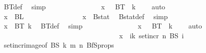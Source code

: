 \begin{isabellebody}
\ BT{\isacharunderscore}{\kern0pt}def\ \isamarkupfalse%
\ simp\isanewline
\ \ \ \ \ \ \ \ \ \ \ \ \isamarkupfalse%
\ \isamarkupfalse%
\ {\isachardoublequoteopen}x\ {\isasymin}\ {\isasymUnion}\ {\isacharparenleft}{\kern0pt}BT\ {\isacharbackquote}{\kern0pt}\ {\isacharbraceleft}{\kern0pt}{\isachardot}{\kern0pt}{\isachardot}{\kern0pt}k\ {\isacharplus}{\kern0pt}\ {}{\isacharbraceright}{\kern0pt}{\isacharparenright}{\kern0pt}{\isachardoublequoteclose}\ \isamarkupfalse%
\ auto\isanewline
\ \ \ \ \ \ \ \ \ \ \isamarkupfalse%
\isanewline
\ \ \ \ \ \ \ \ \ \ \ \ \isamarkupfalse%
\ {\isachardoublequoteopen}x\ {\isasymin}\ BL\ {}{\isachardoublequoteclose}\isanewline
\ \ \ \ \ \ \ \ \ \ \ \ \isamarkupfalse%
\ \isamarkupfalse%
\ {\isachardoublequoteopen}x\ {\isasymin}\ Bstat{\isachardoublequoteclose}\ \isamarkupfalse%
\ Bstat{\isacharunderscore}{\kern0pt}def\ \isamarkupfalse%
\ simp\isanewline
\ \ \ \ \ \ \ \ \ \ \ \ \isamarkupfalse%
\ \isamarkupfalse%
\ {\isachardoublequoteopen}x\ {\isasymin}\ BT\ {\isacharparenleft}{\kern0pt}k{\isacharplus}{\kern0pt}{}{\isacharparenright}{\kern0pt}{\isachardoublequoteclose}\ \isamarkupfalse%
\ BT{\isacharunderscore}{\kern0pt}def\ \isamarkupfalse%
\ simp\isanewline
\ \ \ \ \ \ \ \ \ \ \ \ \isamarkupfalse%
\ \isamarkupfalse%
\ {\isachardoublequoteopen}x\ {\isasymin}\ {\isasymUnion}\ {\isacharparenleft}{\kern0pt}BT\ {\isacharbackquote}{\kern0pt}\ {\isacharbraceleft}{\kern0pt}{\isachardot}{\kern0pt}{\isachardot}{\kern0pt}k\ {\isacharplus}{\kern0pt}\ {}{\isacharbraceright}{\kern0pt}{\isacharparenright}{\kern0pt}{\isachardoublequoteclose}\ \isamarkupfalse%
\ auto\isanewline
\ \ \ \ \ \ \ \ \ \ \isamarkupfalse%
\isanewline
\ \ \ \ \ \ \ \ \isamarkupfalse%
\isanewline
\ \ \ \ \ \ \ \ \ \ \isamarkupfalse%
\ {}\isanewline
\ \ \ \ \ \ \ \ \ \ \isamarkupfalse%
\ \isamarkupfalse%
\ {\isachardoublequoteopen}x\ {\isasymin}\ {\isacharparenleft}{\kern0pt}{\isasymUnion}i{\isasymle}k{\isachardot}{\kern0pt}\ set{\isacharunderscore}{\kern0pt}incr\ n\ {\isacharparenleft}{\kern0pt}BS\ i{\isacharparenright}{\kern0pt}{\isacharparenright}{\kern0pt}{\isachardoublequoteclose}\ \isamarkupfalse%
\ set{\isacharunderscore}{\kern0pt}incr{\isacharunderscore}{\kern0pt}image{\isacharbrackleft}{\kern0pt}of\ BS\ k\ m\ n{\isacharbrackright}{\kern0pt}\ BfS{\isacharunderscore}{\kern0pt}props\ \isamarkupfalse%

\end{isabellebody}
